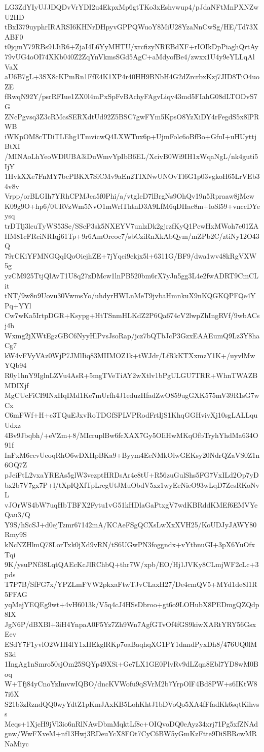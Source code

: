 LG3ZdYIyUJJDQDvVrYDI2u4EkpxMp6gtTKo3xEshvwup4/pJdaNFtMnPXNZwU2HD
tBxI379uyphrIRARSI6KHNrDHpyvGPPQWuoY8MiU28YzaNnCwSg/HE/Td73XABF0
t0jqmY79RBs91JiR6+ZjaI4L6YyMHTU/xrcfizyNREBdXF+rIOIkDpPiaghQrtAy
79vUG4oOI74XKb040Z2ZqYnVkmsSGd5AgC+aMdyofBe4/zwxx1U4y9eYLLqAlVaX
aU6B7gL+3SX8cKPmRn1FfE4K1XP4r40HH9BNbH4G2dZrcrbxKzj7JID8TiO4uoZE
fRwqN92Y/psrRFIue1ZX0l4mPxSpFvBAchyFAgvLiqv43md5FIahG08dLTODvS7G
ZNcPgvsq3Z3cRMcsSERXdtUd92Z5BSC7gwFYm5KpsO8YzXiDY4rFegdS5x8lPRWB
iWKpOM8cTDiTLEhg1TmvicwQ4LXWTux6p+UjmFolc6oBfBo+GfuI+uHUyttjBtXI
/MINAoLhYeoWDlUBA3iDuWmvYpIbB6EL/XcivB0Wi9IH1xWqaNgL/nk4guti5IjY
1HvkXXe7FnMY7bcPBKX7SiCMv9aEn2TIXNwUNOvTl6G1p03vgkoH65LrVEb34v8v
Vrpp/orBLGIh7YRhCPMJca5f0Phi/a/vtgIcD7lBrgNs9OhQv19n5Rpraaw8jMcw
K09g9O+hp6/0URVzWm5NvO1mWrlThtnD3A9LfM6qDHac8m+loSl59+vnccDYeysq
trDTlj3lcuTyWS53Se/SScP3sk5NXEYV7unlzDk2gjrzfKyQ1PcwHxMWoh7e01ZA
HM81cFRciNRIqj61Tp+9r6AmOreoc7/sbCziRnXkAbQym/mZPb2C/ztiNy12O43Q
79rCKiYFMNGQqIQoOiejhZE+7jYqci9ekjx5l+6311G/BF9/dwa1wv48kRgVXW5g
yzCM925TtjQlAvT1U8q27zDMcw1lnPB520bm6rX7yJn5gg3L4e2fwADRT9CmCLit
tNT/9w8n9Uovu30VwmsYo/uhdyrHWLnMeT9jvbaHmnkuX9nKQGKQPFQe4YPq+YYl
Cw7wKa5IrtpDGR+Ksypg+HtTSnmHLKdZ2P6Qa674cV2lwpZhIngRVf/9wbACsj4b
Wxmg2jXWtEgzGBC6NyyHlPvsJsoRap/jcz7bQTbJcP3GzxEAAEumQ9Lz3Y8haCg7
kW4vFVyVAz0WjP7JMlIiq83MIIMOZ1k+tWJdr/LfRkKTXxmzY1K+/uyvlMwYQb94
R0y1hnY9IglnLZVu4AsR+5mgTVeTiAY2wXtlv1bPgULGU7TRR+WhnTWAZBMDIXjf
MgCUcFiCI9INxHqIMd1Ke7mUrfh4J1eduzHfadZwO859ugGXK575mV39R1sG7wCx
C6mFWf+H+c3TQuEJxvRoTDGfSPLVPRodFrtIjS1KhqGGHvivXj10sgLALLquUdxz
4Bv9Jbqbh/+eVZm+8/MIcruplBw6fcXAX7Gy5OIiHwMKqOfbTryhYhdMa634O91f
InFxM6ccvUeoqRhO6wDXHpBKa9+Byym4EeNMkOlwGEKsy20NdrQZaVS0Z1n6OQ7Z
pJeiFtL2vxaYREAs5glW3vezptHRDsAr4e8tU+R56zuGulShs5FG7VxILd2Op7yD
bx2b7V7gx7P+l/tXpIQXfTpLregUtJMuObdV5xz1wyEeNieO93wLqD7ZesRKoNvL
vJOrWS4bW7uqHbTBFX2Fytu1vG51kHDlaGaPtxgV7wdKBRddKMEf6EMVYeQau3/Q
Y9S/hScSJ+d0ejTzmr67142mA/KCAeFSgQCXsLwXxXVH25/KoUDJyJAWY80Rmy9S
kNcNZHlmQ78LorTxk0jXd9vRN/tS6UGwPN3foggndx+vYtbnuGI+3pX6YuOfxTqi
9K/ysuPNf38LqtQAEcKcJlRChbQ+thr7W/xpb/EO/Hj1JVKy8CLmjWF2cLc+3pds
T7P7B/SfFG7x/YPZLmFVW2pkxaFtwTJvCLaxH27/De4cmQV5+MYd1de8I1R5FFAG
yqMejYEQEg9wt+4vH6013k/V5q4cJ4HSsDbroo+gt6o9LOHubX8PEDmgQZQdp8IX
JgN6P/dBXBl+3iH4YnpaA0F5Yz7Zh9Wn7AgfGTvOf4fGS9kiwXARtYRY56GsxEev
ESdY7F1yvlO2WHI4lY1xHEkglRKp7oaBaqhqXG1PY1dnndPyxDh8/476UQ0lMS3d
1IngAg1nSmro50sjOm25SQYp49XSi+Ge7LX1GE0PlvRv9dLZqn8Ebl7YD8wM0Boq
W+Tfj84yCnoYzImvwIQBO/dncKVWofu9qSVrM2b7YrpOlF4Bd8PW+s6IKtW87i6X
S21b3zRzndQQ0wyYdtZ1pKmJAxKB5LohKhtJ1bDVoQo5XA4fFfadKk6sqtKihvss
Meqs+1XjcH9jVl3io6nRlNAwDbmMqktLf8c+OIQvoDQ0eAyz34xrj71Pg5xfZNAd
gnw/WwFXveM+nf13Hwj3RDeuYcX8FOt7CyC6BW5yGmKzFtte9DiSBRcwMRNaMiyc
